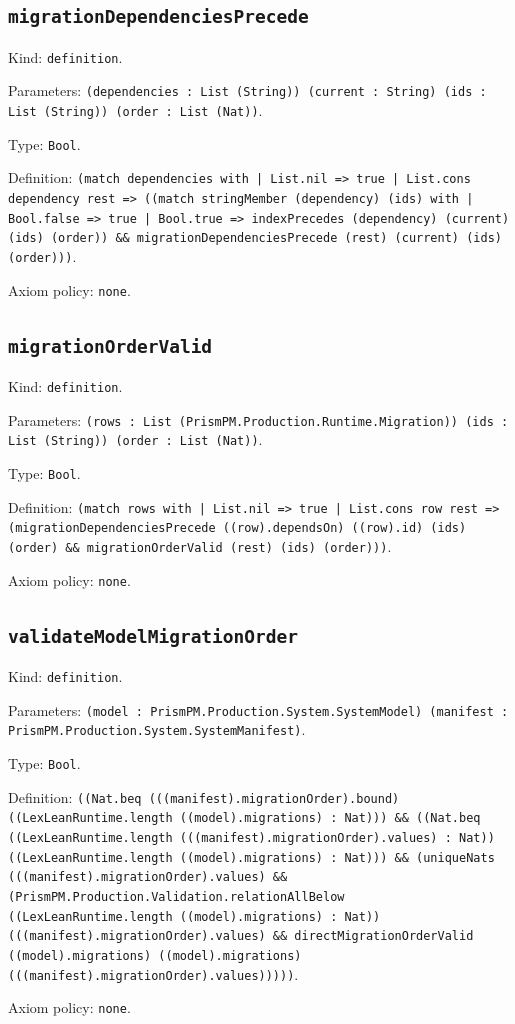 \documentclass[11pt]{article}
\begin{document}
\subsection*{\texttt{migrationDependenciesPrecede}}
\noindent Kind: \texttt{definition}.\par
\noindent Parameters: \texttt{(dependencies : List (String)) (current : String) (ids : List (String)) (order : List (Nat))}.\par
\noindent Type: \texttt{Bool}.\par
\noindent Definition: \texttt{(match dependencies with | List.nil => true | List.cons dependency rest => ((match stringMember (dependency) (ids) with | Bool.false => true | Bool.true => indexPrecedes (dependency) (current) (ids) (order)) \&\& migrationDependenciesPrecede (rest) (current) (ids) (order)))}.\par
\noindent Axiom policy: \texttt{none}.\par
\subsection*{\texttt{migrationOrderValid}}
\noindent Kind: \texttt{definition}.\par
\noindent Parameters: \texttt{(rows : List (PrismPM.Production.Runtime.Migration)) (ids : List (String)) (order : List (Nat))}.\par
\noindent Type: \texttt{Bool}.\par
\noindent Definition: \texttt{(match rows with | List.nil => true | List.cons row rest => (migrationDependenciesPrecede ((row).dependsOn) ((row).id) (ids) (order) \&\& migrationOrderValid (rest) (ids) (order)))}.\par
\noindent Axiom policy: \texttt{none}.\par
\subsection*{\texttt{validateModelMigrationOrder}}
\noindent Kind: \texttt{definition}.\par
\noindent Parameters: \texttt{(model : PrismPM.Production.System.SystemModel) (manifest : PrismPM.Production.System.SystemManifest)}.\par
\noindent Type: \texttt{Bool}.\par
\noindent Definition: \texttt{((Nat.beq (((manifest).migrationOrder).bound) ((LexLeanRuntime.length ((model).migrations) : Nat))) \&\& ((Nat.beq ((LexLeanRuntime.length (((manifest).migrationOrder).values) : Nat)) ((LexLeanRuntime.length ((model).migrations) : Nat))) \&\& (uniqueNats (((manifest).migrationOrder).values) \&\& (PrismPM.Production.Validation.relationAllBelow ((LexLeanRuntime.length ((model).migrations) : Nat)) (((manifest).migrationOrder).values) \&\& directMigrationOrderValid ((model).migrations) ((model).migrations) (((manifest).migrationOrder).values)))))}.\par
\noindent Axiom policy: \texttt{none}.\par
\end{document}
